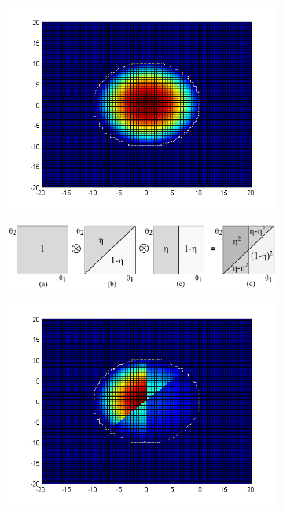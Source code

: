 \begin{figure}%
\centering
\begin{subfigure}{.2\textwidth}
  \centering
  \includegraphics[width=.99\textwidth]{pic/bpplPriorART.png}
  \label{fig:prior2d}
\end{subfigure}%
\begin{subfigure}{.58\textwidth}
\centering
\includegraphics[width=.99\textwidth]{pic/running1.pdf}
\caption{}
\label{fig:pref}
\end{subfigure}
\begin{subfigure}{.2\textwidth}
  \centering
  \includegraphics[width=.99\textwidth]{pic/bpplPosteriorIII.png}

\end{subfigure}
\end{figure}
